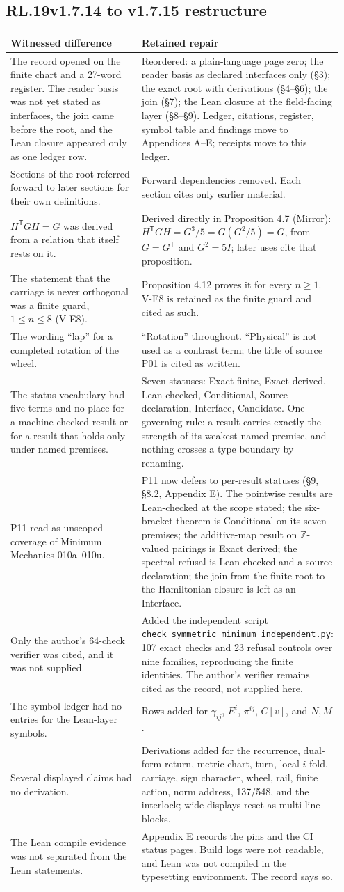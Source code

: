 \documentclass[11pt,a4paper]{article}
\makeatletter
\newcommand{\tp}{^{\mathsf T}}\newcommand{\RR}{\mathbb R}
\newcommand{\rbegin}[3]{\subsection*{#1\quad #2 \hfill {\normalfont\small #3}}\addcontentsline{toc}{subsection}{#1\quad #2}%
  \begin{longtable}{@{}>{\raggedright\arraybackslash}p{0.475\linewidth}@{\hspace{1.2em}}>{\raggedright\arraybackslash}p{0.475\linewidth}@{}}
  \toprule Witnessed difference & Retained repair\\\midrule\endhead\bottomrule\endfoot}
\newcommand{\rend}{\end{longtable}}
\newcommand{\row}[2]{#1 & #2\\[4pt]}
\makeatother
\begin{document}
\rbegin{RL.19}{v1.7.14 to v1.7.15}{restructure}
\row{The record opened on the finite chart and a 27-word register. The reader basis was not yet stated as interfaces, the join came before the root, and the Lean closure appeared only as one ledger row.}{Reordered: a plain-language page zero; the reader basis as declared interfaces only (\S3); the exact root with derivations (\S4--\S6); the join (\S7); the Lean closure at the field-facing layer (\S8--\S9). Ledger, citations, register, symbol table and findings move to Appendices A--E; receipts move to this ledger.}
\row{Sections of the root referred forward to later sections for their own definitions.}{Forward dependencies removed. Each section cites only earlier material.}
\row{$H\tp GH=G$ was derived from a relation that itself rests on it.}{Derived directly in Proposition 4.7 (Mirror): $H\tp GH=G^3/5=G(G^2/5)=G$, from $G=G\tp$ and $G^2=5I$; later uses cite that proposition.}
\row{The statement that the carriage is never orthogonal was a finite guard, $1\le n\le8$ (V-E8).}{Proposition 4.12 proves it for every $n\ge1$. V-E8 is retained as the finite guard and cited as such.}
\row{The wording ``lap'' for a completed rotation of the wheel.}{``Rotation'' throughout. ``Physical'' is not used as a contrast term; the title of source P01 is cited as written.}
\row{The status vocabulary had five terms and no place for a machine-checked result or for a result that holds only under named premises.}{Seven statuses: Exact finite, Exact derived, Lean-checked, Conditional, Source declaration, Interface, Candidate. One governing rule: a result carries exactly the strength of its weakest named premise, and nothing crosses a type boundary by renaming.}
\row{P11 read as unscoped coverage of Minimum Mechanics 010a--010u.}{P11 now defers to per-result statuses (\S9, \S8.2, Appendix E). The pointwise results are Lean-checked at the scope stated; the six-bracket theorem is Conditional on its seven premises; the additive-map result on $\mathbb Z$-valued pairings is Exact derived; the spectral refusal is Lean-checked and a source declaration; the join from the finite root to the Hamiltonian closure is left as an Interface.}
\row{Only the author's 64-check verifier was cited, and it was not supplied.}{Added the independent script \texttt{check\_symmetric\_minimum\_independent.py}: 107 exact checks and 23 refusal controls over nine families, reproducing the finite identities. The author's verifier remains cited as the record, not supplied here.}
\row{The symbol ledger had no entries for the Lean-layer symbols.}{Rows added for $\gamma_{ij}$, $E^i$, $\pi^{ij}$, $C[v]$, and $N,M$.}
\row{Several displayed claims had no derivation.}{Derivations added for the recurrence, dual-form return, metric chart, turn, local $i$-fold, carriage, sign character, wheel, rail, finite action, norm address, 137/548, and the interlock; wide displays reset as multi-line blocks.}
\row{The Lean compile evidence was not separated from the Lean statements.}{Appendix E records the pins and the CI status pages. Build logs were not readable, and Lean was not compiled in the typesetting environment. The record says so.}
\rend
\end{document}
